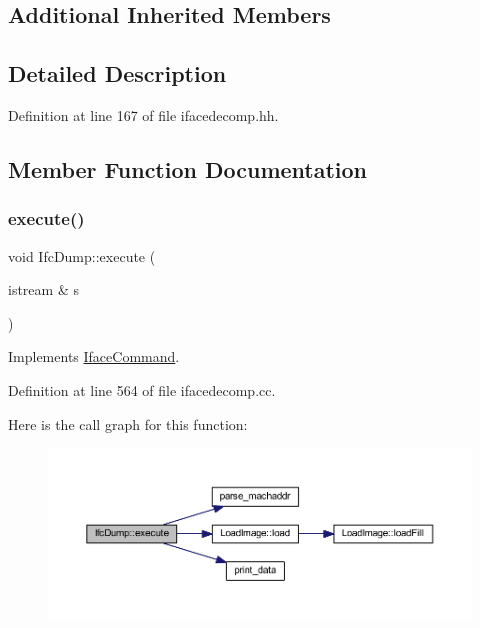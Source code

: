 \subsection*{Additional Inherited Members}


\subsection{Detailed Description}


Definition at line 167 of file ifacedecomp.\+hh.



\subsection{Member Function Documentation}
\mbox{\label{class_ifc_dump_a4e3abbc8ca445ed10d88c2cf31f57601}} 
\subsubsection{\texorpdfstring{execute()}{execute()}}
{\footnotesize\ttfamily void Ifc\+Dump\+::execute (\begin{DoxyParamCaption}\item[{istream \&}]{s }\end{DoxyParamCaption})\hspace{0.3cm}{\ttfamily [virtual]}}



Implements \mbox{\hyperlink{class_iface_command_af10e29cee2c8e419de6efe9e680ad201}{Iface\+Command}}.



Definition at line 564 of file ifacedecomp.\+cc.

Here is the call graph for this function\+:
\nopagebreak
\begin{figure}[H]
\begin{center}
\leavevmode
\includegraphics[width=350pt]{class_ifc_dump_a4e3abbc8ca445ed10d88c2cf31f57601_cgraph}
\end{center}
\end{figure}


